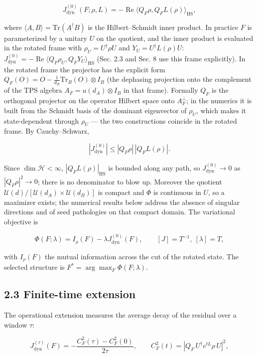 \documentclass[
]{article}
\begin{document}
\[J_{\mathrm{dyn}}^{(0)}(F;\rho,L) = -\operatorname{Re}\langle Q_F\rho,
Q_F L(\rho)\rangle_{\mathrm{HS}},\]

where \(\langle A,B\rangle = \mathrm{Tr}(A^\dagger B)\) is the
Hilbert--Schmidt inner product. In practice \(F\) is parameterized by a
unitary \(U\) on the quotient, and the inner product is evaluated in the
rotated frame with \(\rho_U = U^\dagger \rho U\) and
\(Y_U = U^\dagger L(\rho) U\):
\(J_{\mathrm{dyn}}^{(0)} = -\operatorname{Re}\langle Q_F\rho_U,
Q_FY_U\rangle_{\mathrm{HS}}\) (Sec. 2.3 and Sec. 8 use this frame
explicitly). In the rotated frame the projector has the explicit form
\(Q_F(O) = O - \frac{1}{d_B}\mathrm{Tr}_B(O)\otimes I_B\) (the dephasing
projection onto the complement of the TPS algebra \(A_F = u(d_A)\otimes
I_B\) in that frame). Formally \(Q_F\) is the orthogonal projector on
the operator Hilbert space onto \(A_F^\perp\); in the numerics it is
built from the Schmidt basis of the dominant eigenvector of \(\rho_U\),
which makes it state-dependent through \(\rho_U\) --- the two
constructions coincide in the rotated frame. By Cauchy--Schwarz,

\[|J_{\mathrm{dyn}}^{(0)}| \le |Q_F\rho|\,|Q_FL(\rho)|.\]

Since \(\dim\mathcal{H} < \infty\), \(|Q_FL(\rho)|_{\mathrm{HS}}\) is
bounded along any path, so \(J_{\mathrm{dyn}}^{(0)} \to 0\) as
\(|Q_F\rho|^2 \to 0\); there is no denominator to blow up. Moreover the
quotient \(\mathcal{U}(d)/[\mathcal{U}(d_A)\times\mathcal{U}(d_B)]\) is
compact and \(\Phi\) is continuous in \(U\), so a maximizer exists; the
numerical results below address the absence of singular directions and
of seed pathologies on that compact domain. The variational objective is

\[\Phi(F;\lambda) = I_\rho(F) - \lambda J_{\mathrm{dyn}}^{(0)}(F),
\qquad [J] = T^{-1},\ [\lambda] = T,\]

with \(I_\rho(F)\) the mutual information across the cut of the rotated
state. The selected structure is \(F^* = \arg\max_F \Phi(F;\lambda)\).

\subsection{2.3 Finite-time extension}\label{finite-time-extension}

The operational extension measures the average decay of the residual
over a window \(\tau\):

\[J_{\mathrm{dyn}}^{(\tau)}(F) = -\frac{C_F^2(\tau) - C_F^2(0)}{2\tau},
\qquad C_F^2(t) = |Q_F\, U^\dagger e^{tL}\rho\, U|^2,\]
\end{document}

